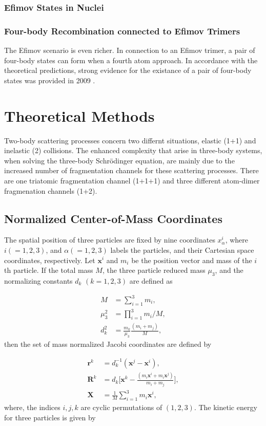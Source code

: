\documentclass{article}
\begin{document}
\subsubsection{Efimov States in Nuclei }

\subsubsection{Four-body Recombination connected to Efimov Trimers} 
The Efimov scenario is even richer. In connection to an Efimov trimer, a pair of four-body states can form when a fourth atom approach. In accordance with the theoretical predictions, strong evidence for the existance of a pair of four-body states was provided in 2009 \cite{Grimm:2009}. 



\section{Theoretical Methods} 
Two-body scattering processes concern two differnt situations, elastic (1+1) and inelastic (2) collisions. The enhanced complexity that arise in three-body systems, when solving the three-body Schr{\"o}dinger equation, are mainly due to the increased number of fragmentation channels for these scattering processes. There are one triatomic fragmentation channel (1+1+1) and three different atom-dimer fragmenation channels (1+2).   
  

\subsection{Normalized Center-of-Mass Coordinates}
The spatial position of three particles are fixed by nine coordinates $x_{\alpha}^{i}$, where $i(=1,2,3)$, and $\alpha(=1,2,3)$ labels the particles, and their Cartesian space coordinates, respectively. Let $\mathbf{x}^i$ and $m_{i}$ be the position vector and mass of the $i$th particle. If the total mass $M$, the three particle reduced mass $\mu_{3}$, and the normalizing constants $d_{k}$ $(k=1,2,3)$ are defined as

\begin{align}
M &= \sum_{i=1}^{3}m_i,\\
\mu_3^2 &= \prod_{i=1}^{3}m_i/M,\\
d_k^2 &= \frac{m_k}{\mu_3}\frac{(m_i+m_j)}{M}, 
\end{align}
then the set of mass normalized Jacobi coordinates are defined by

\begin{align}
\mathbf{r}^k &= d^{-1}_k(\mathbf{x}^{j}-\mathbf{x}^{i}),\\
\mathbf{R}^k &= d_k\Big[\mathbf{x}^{k}-\frac{(m_{i}\mathbf{x}^{i}+m_{i}\mathbf{x}^{j})}{m_{i}+m_{j}}\Big],\\
\mathbf{X} &= \frac{1}{M} \sum_{i=1}^{3} m_{i} \mathbf{x}^{i},
\end{align}   
where, the indices $i,j,k$ are cyclic permutations of $(1,2,3)$. The kinetic energy for three particles is given by
\end{document}
